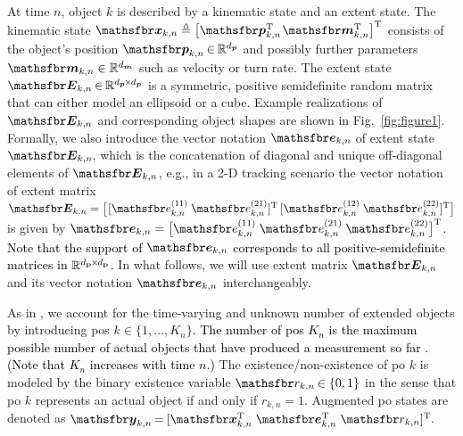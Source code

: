 \documentclass[10pt, twoside, romanappendices]{IEEEtran}
\providecommand{\rd}{\textcolor{black}}
\providecommand{\ist}{\hspace*{.3mm}}
\providecommand{\rmv}{\hspace*{-.3mm}}
\newcommand{\T}{\text{T}}
\begin{document}
At time $n$, object $k$ is described by a kinematic state and an extent state. The kinematic state $\RV{x}_{k,n} \triangleq \big[\RV{p}^{\T}_{k,n} \ist \RV{m}^{\T}_{k,n} \big]^{\T}$ consists of the object's position $\RV{p}_{k,n}  \rmv\in\rmv \mathbb{R}^{d_{\V{p}}}$ and possibly further parameters $\RV{m}_{k,n}  \in \mathbb{R}^{d_{\V{m}}}$ such as velocity or turn rate.  The extent state $\RM{E}_{k,n} \rmv\in\rmv \mathbb{R}^{d_{\V{p}} \rmv\times\rmv d_{\V{p}}}$ is a symmetric, positive semidefinite random matrix that can either model an ellipsoid or a cube. Example realizations of $\RM{E}_{k,n}$ and corresponding object shapes are shown in Fig.~\ref{fig:figure1}. Formally, we also introduce the vector notation $\RV{e}_{k,n}\rmv$ of extent state $\RM{E}_{k,n}\rmv$, which is the concatenation of diagonal and unique off-diagonal elements of $\RM{E}_{k,n}$, e.g., in a 2-D tracking scenario the vector notation of extent matrix $\RM{E}_{k,n} = \big[\ist [\rv{e}^{(11)}_{k,n}  \ist\ist\ist \rv{e}^{(21)}_{k,n}]^{\T} \ist\ist [\rv{e}^{(12)}_{k,n}  \ist\ist\ist \rv{e}^{(22)}_{k,n} ]^{\T} \big]$ is given by $\RV{e}_{k,n} = \big[ \rv{e}^{(11)}_{k,n}  \ist\ist\ist \rv{e}^{(21)}_{k,n}  \ist\ist\ist \rv{e}^{(22)}_{k,n}  \big]^{\T}$\rmv\rmv\rmv. \rd{Note that the support of $\RV{e}_{k,n}$ corresponds to all positive-semidefinite matrices in $\mathbb{R}^{d_{\mathbf{p}} \rmv\times\rmv d_{\mathbf{p}}}$.} In what follows, we will use extent matrix $\RM{E}_{k,n}$ and its vector notation $\RV{e}_{k,n}$ interchangeably. 

As in \cite{MeyBraWilHla:J17,MeyLiuWin:C18,MeyKroWilLauHlaBraWin:J18}, we account for the time-varying and unknown number of extended objects by introducing \acp{po} $k \in \{ 1,\dots, K_n \}$. \rd{The number of \acp{po} $K_n$ is the maximum possible number of actual objects that have produced a measurement so far \cite{MeyKroWilLauHlaBraWin:J18}. (Note that $K_n$ increases with time $n$.)} The existence/non-existence of \ac{po} $k$ is modeled by the binary existence variable $\rv{r}_{k,n} \rmv\in \{0,1\}$ in the sense that \ac{po} $k$ represents an actual object if and only if $r_{k,n} \!=\! 1$. Augmented \ac{po} states are denoted as $\RV{y}_{k,n} \rmv=\rmv [\RV{x}^{\T}_{k,n} \; \RV{e}^{\T}_{k,n} \;  \rv{r}_{k,n} ]^\T\rmv\rmv$.
\end{document}
